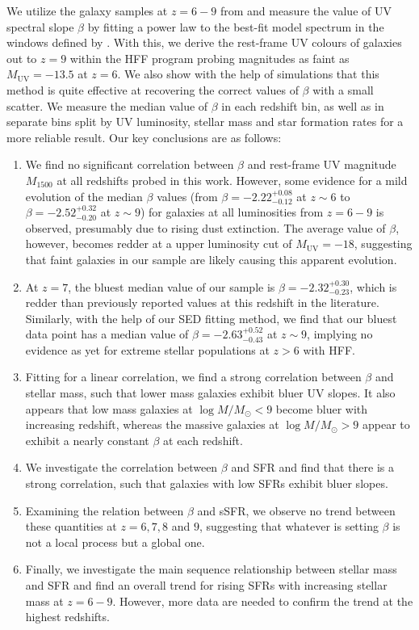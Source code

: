 \documentclass[twocolumn]{aastex63}
\begin{document}
We utilize the galaxy samples at $z=6-9$ from \citet{Bhatawdekar2019} and measure the value of UV spectral slope $\beta$ by fitting a power law to the best-fit model spectrum in the windows defined by \citet{Calzetti1994}. With this, we derive the rest-frame UV colours of galaxies out to $z=9$ within the HFF program probing magnitudes as faint as $M\mathrm{_{UV}=-13.5}$ at $z=6$. We also show with the help of simulations that this method is quite effective at recovering the correct values of $\beta$ with a small scatter. We measure the median value of $\beta$ in each redshift bin, as well as in separate bins split by UV luminosity, stellar mass and star formation rates for a more reliable result. Our key conclusions are as follows:
\begin{enumerate}[itemsep=0pt,parsep=0pt]
 \item We find no significant correlation between $\beta$ and rest-frame UV magnitude $M_{1500}$ at all redshifts probed in this work. However, some evidence for a mild evolution of the median $\beta$ values (from $\beta=-2.22_{-0.12}^{+0.08}$ at $z\sim6$ to $\beta=-2.52_{-0.20}^{+0.32}$ at $z\sim9$) for galaxies at all luminosities from $z=6-9$ is observed, presumably due to rising dust extinction. The average value of $\beta$, however, becomes redder at a upper luminosity cut of $M_{\mathrm{UV}}=-18$, suggesting that faint galaxies in our sample are likely causing this apparent evolution. 
 \item At $z=7$, the bluest median value of our sample is $\beta=-2.32_{-0.23}^{+0.30}$, which is redder than previously reported values at this redshift in the literature. Similarly, with the help of our SED fitting method, we find that our bluest data point has a median value of $\beta=-2.63_{-0.43}^{+0.52}$ at $z\sim9$, implying no evidence as yet for extreme stellar populations at $z>6$ with HFF.
 \item Fitting for a linear correlation, we find a strong correlation between $\beta$ and stellar mass, such that lower mass galaxies exhibit bluer UV slopes. It also appears that low mass galaxies at $\log M/M_{\odot}<9$ become bluer with increasing redshift, whereas the massive galaxies at $\log M/M_{\odot}>9$ appear to exhibit a nearly constant $\beta$ at each redshift. 
 \item We investigate the correlation between $\beta$ and SFR and find that there is a strong correlation, such that galaxies with low SFRs exhibit bluer slopes.
 \item Examining the relation between $\beta$ and sSFR, we observe no trend between these quantities at $z=6,7,8$ and $9$, suggesting that whatever is setting $\beta$ is not a local process but a global one.
 \item Finally, we investigate the main sequence relationship between stellar mass and SFR and find an overall trend for rising SFRs with increasing stellar mass at $z=6-9$. However, more data are needed to confirm the trend at the highest redshifts.
\end{enumerate}
\end{document}
